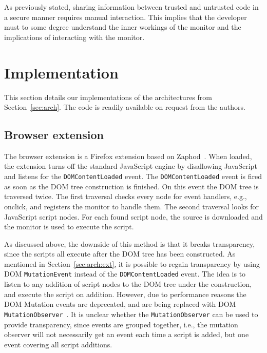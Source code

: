 \documentclass{llncs}
\begin{document}
As previously stated, sharing information 
between trusted and untrusted code in a secure manner requires manual interaction. 
This implies that the developer must to some degree understand the inner workings of the monitor
and the implications of interacting with the monitor.


\section{Implementation}
\label{sec:impl}

This section details our implementations of the architectures
from Section~\ref{sec:arch}. The code is readily available on request
from the authors.


\subsection{Browser extension}

The browser extension is a Firefox extension based on Zaphod~\cite{Zaphod}.
%
When loaded, the extension turns off the standard JavaScript engine by
disallowing JavaScript and listens for the \lstinline{DOMContentLoaded} event.  The
\lstinline{DOMContentLoaded} event is fired as soon as the DOM tree construction is
finished.  On this event the DOM tree is traversed twice. The first traversal
checks every node for event handlers, e.g., onclick, and registers the monitor
to handle them. The second traversal looks for JavaScript script nodes.  For
each found script node, the source is downloaded and the
monitor is used to execute the script.

As discussed above, the downside of this method is that it breaks
transparency, since the scripts all execute after the DOM
tree has been constructed. As mentioned in Section~\ref{sec:arch:ext}, it is possible to regain transparency by using DOM
\lstinline{MutationEvent} instead of the \lstinline{DOMContentLoaded} event.  The idea is to listen
to any addition of script nodes to the DOM tree under the construction, and
execute the script on addition.  However, due to performance reasons the DOM
Mutation events are deprecated, and are being replaced with DOM \lstinline{MutationObserver}~\cite{DOM4}. 
It is unclear whether the \lstinline{MutationObserver} can be used to
provide transparency, since events are grouped together, i.e., the mutation
observer will not necessarily get an event each time a script is added, but one
event covering all script additions.
\end{document}
